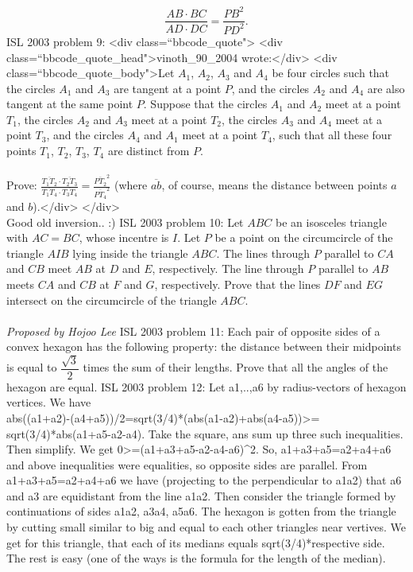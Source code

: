 \[ \frac{AB\cdot BC}{AD\cdot DC}=\frac{PB^2}{PD^2}. \] 
ISL 2003 problem 9:  <div class=``bbcode_quote">
<div class=``bbcode_quote_head">vinoth_90_2004 wrote:</div>
<div class=``bbcode_quote_body">Let $ A_1$, $ A_2$, $ A_3$ and $ A_4$ be four circles such that the circles $ A_1$ and $ A_3$ are tangent at a point $ P$, and the circles $ A_2$ and $ A_4$ are also tangent at the same point $ P$. Suppose that the circles $ A_1$ and $ A_2$ meet at a point $ T_1$, the circles $ A_2$ and $ A_3$ meet at a point $ T_2$, the circles $ A_3$ and $ A_4$ meet at a point $ T_3$, and the circles $ A_4$ and $ A_1$ meet at a point $ T_4$, such that all these four points $ T_1$, $ T_2$, $ T_3$, $ T_4$ are distinct from $ P$. \\\\
Prove: $ \frac {\overline{T_1T_2}\cdot\overline{T_2T_3}}{\overline{T_1T_4}\cdot\overline{T_3T_4}} = \frac {\overline{PT_2}^2}{\overline{PT_4}^2}$ (where $ \overline{ab}$, of course, means the distance between points $ a$ and $ b$).</div>
</div> \\
Good old inversion.. :) 
ISL 2003 problem 10:  Let $ABC$ be an isosceles triangle with $AC=BC$, whose incentre is $I$. Let $P$ be a point on the circumcircle of the triangle $AIB$ lying inside the triangle $ABC$. The lines through $P$ parallel to $CA$ and $CB$ meet $AB$ at $D$ and $E$, respectively. The line through $P$ parallel to $AB$ meets $CA$ and $CB$ at $F$ and $G$, respectively. Prove that the lines $DF$ and $EG$ intersect on the circumcircle of the triangle $ABC$. \\\\
\textit{Proposed by Hojoo Lee} 
ISL 2003 problem 11:  Each pair of opposite sides of a convex hexagon has the following property: the distance between their midpoints is equal to  $\dfrac{\sqrt{3}}{2}$ times the sum of their lengths. Prove that all the angles of the hexagon are equal. 
ISL 2003 problem 12:  Let a1,..,a6 by radius-vectors of hexagon vertices. We have \\
abs((a1+a2)-(a4+a5))/2=sqrt(3/4)*(abs(a1-a2)+abs(a4-a5))>= \\
sqrt(3/4)*abs(a1+a5-a2-a4). Take the square, ans sum up three such inequalities. Then simplify. We get 0>=(a1+a3+a5-a2-a4-a6)^2. So, a1+a3+a5=a2+a4+a6 and above inequalities were equalities, so opposite sides are parallel. From a1+a3+a5=a2+a4+a6 we have (projecting to the perpendicular to a1a2) that a6 and a3 are equidistant from the line a1a2. Then consider the triangle formed by continuations of sides a1a2, a3a4, a5a6. The hexagon is gotten from the triangle by cutting small similar to big and equal to each other triangles near vertives. We get for this triangle, that each of its medians equals sqrt(3/4)*respective side. The rest is easy (one of the ways is the formula for the length of the median). 
